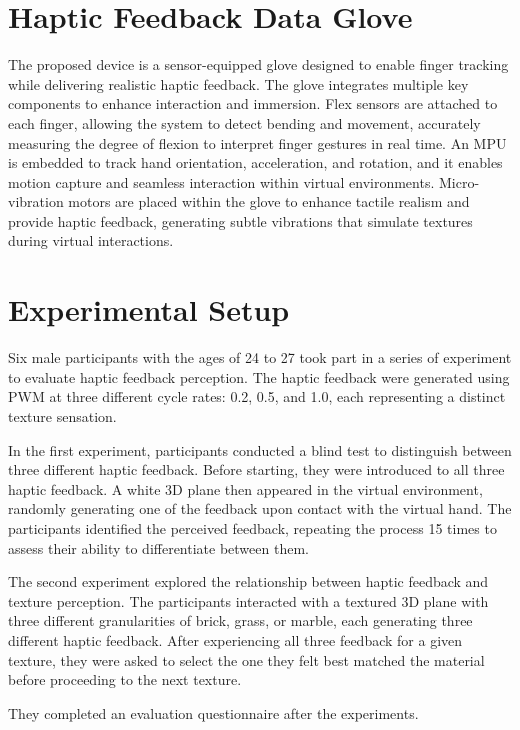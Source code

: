 \documentclass[a4paper,twocolumn]{article}
\begin{document}
\section{Haptic Feedback Data Glove}
The proposed device is a sensor-equipped glove designed to enable finger tracking while delivering realistic haptic feedback. The glove integrates multiple key components to enhance interaction and immersion. Flex sensors are attached to each finger, allowing the system to detect bending and movement, accurately measuring the degree of flexion to interpret finger gestures in real time. An MPU is embedded to track hand orientation, acceleration, and rotation, and it enables motion capture and seamless interaction within virtual environments. Micro-vibration motors are placed within the glove to enhance tactile realism and provide haptic feedback, generating subtle vibrations that simulate textures during virtual interactions.

\section{Experimental Setup}
Six male participants with the ages of 24 to 27 took part in a series of experiment to evaluate haptic feedback perception. The haptic feedback were generated using PWM at three different cycle rates: 0.2, 0.5, and 1.0, each representing a distinct texture sensation.\par
In the first experiment, participants conducted a blind test to distinguish between three different haptic feedback. Before starting, they were introduced to all three haptic feedback. A white 3D plane then appeared in the virtual environment, randomly generating one of the feedback upon contact with the virtual hand. The participants identified the perceived feedback, repeating the process 15 times to assess their ability to differentiate between them.\par
The second experiment explored the relationship between haptic feedback and texture perception. The participants interacted with a textured 3D plane with  three different granularities of brick, grass, or marble, each generating three different haptic feedback. After experiencing all three feedback for a given texture, they were asked to select the one they felt best matched the material before proceeding to the next texture.\par
They completed an evaluation questionnaire after the experiments. 					
\end{document}
